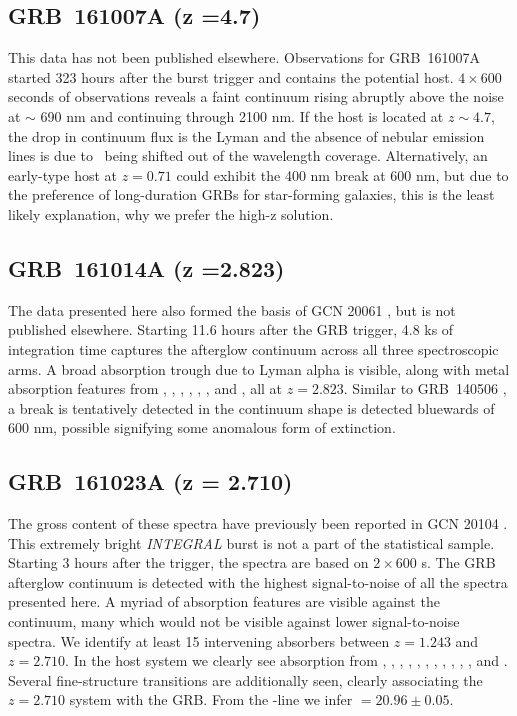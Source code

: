 \documentclass{aa}    %
\begin{document}
\subsection{GRB~161007A (z =4.7)} \label{161007}

This data has not been published elsewhere. Observations for GRB~161007A started
323 hours after the burst trigger and contains the potential host. $4 \times
600$ seconds of observations reveals a faint continuum rising abruptly above the
noise at $\sim$ 690 nm and continuing through 2100 nm. If the host is located at
$z \sim 4.7$, the drop in continuum flux is the Lyman and the
absence of nebular emission lines is due to \oii~being shifted out of the
wavelength coverage. Alternatively, an early-type host at $z = 0.71$ could
exhibit the 400 nm break at 600 nm, but due to the preference of long-duration
GRBs for star-forming galaxies, this is the least likely explanation, why we
prefer the high-z solution.

\subsection{GRB~161014A (z =2.823)} \label{161014}

The data presented here also formed the basis of GCN  20061 \citep{GCN20061},
but is not published elsewhere. Starting 11.6 hours after the GRB trigger, 4.8
ks of integration time captures the afterglow continuum across all three
spectroscopic arms. A broad absorption trough due to Lyman alpha is visible,
along with metal absorption features from \mgii, \SIii, \cii, \civ, \alii,
\aliii, and	\feii, all at $z =2.823$. Similar to GRB~140506 \citep{Fynbo2014,
	Heintz2017b},  a break is tentatively detected in the continuum shape is
detected bluewards of 600 nm, possible signifying some anomalous form of
extinction.


\subsection{GRB~161023A (z = 2.710)}\label{161023}

The gross content of these spectra have previously been reported in GCN 20104
\citep{GCN20104}. This extremely bright \textit{INTEGRAL} burst is not a part of
the statistical sample. Starting 3 hours after the trigger, the spectra are
based on $2 \times 600$ s. The GRB afterglow continuum is detected with the
highest signal-to-noise of all the spectra presented here. A myriad of
absorption features are visible against the continuum, many which would not be
visible against lower signal-to-noise spectra. We identify at least 15
intervening absorbers between $z = 1.243$ and $z = 2.710$. In the host system we
clearly see absorption from \lyb, \lya, \sii, \SIii, \oi, \SIiv, \civ, \alii,
\aliii, \feii, \mgii, and \mgi. Several fine-structure transitions are
additionally seen, clearly associating the $z = 2.710$ system with the GRB. From
the \lya-line we infer \nh$=20.96 \pm 0.05$.
\end{document}
